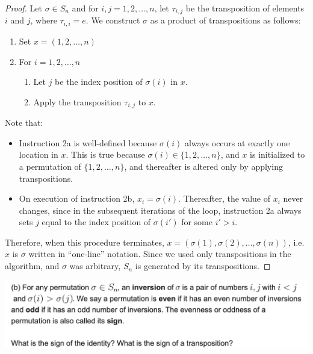 \begin{proof}
  Let $\sigma \in S_n$ and for $i, j = 1, 2, \ldots, n$, let $\tau_{i,j}$ be the transposition of elements
  $i$ and $j$, where $\tau_{i,i} = e$. We construct $\sigma$ as a product of transpositions as follows:

  \begin{enumerate}
  \item Set $x = (1, 2, \ldots, n)$
  \item For $i = 1, 2, \ldots, n$
    \begin{enumerate}
    \item Let $j$ be the index position of $\sigma(i)$ in $x$.
    \item Apply the transposition $\tau_{i,j}$ to $x$.
    \end{enumerate}
  \end{enumerate}
  Note that:
  \begin{itemize}
  \item Instruction 2a is well-defined because $\sigma(i)$ always occurs at exactly one location in
    $x$. This is true because $\sigma(i) \in \{1, 2, \ldots, n\}$, and $x$ is initialized to a permutation
    of $\{1, 2, \ldots, n\}$, and thereafter is altered only by applying transpositions.
  \item On execution of instruction 2b, $x_i = \sigma(i)$. Thereafter, the value of $x_i$ never changes,
    since in the subsequent iterations of the loop, instruction 2a always sets $j$ equal to the
    index position of $\sigma(i')$ for some $i' > i$.
  \end{itemize}

  Therefore, when this procedure terminates, $x = (\sigma(1), \sigma(2), \ldots, \sigma(n))$, i.e.
  $x$ is $\sigma$ written in ``one-line​'' notation. Since we used only transpositions in the algorithm,
  and $\sigma$ was arbitrary, $S_n$ is generated by its transpositions.
\end{proof}



\begin{mdframed}
\includegraphics[width=400pt]{img/algebra--nf--2-d8ce.png}
\end{mdframed}


